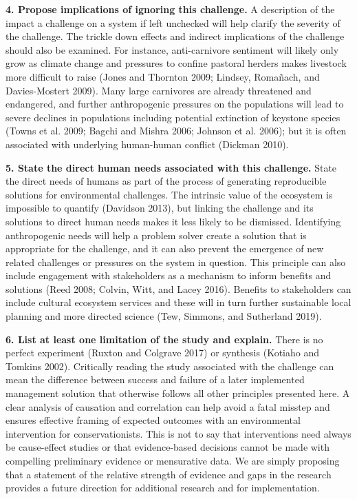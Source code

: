 \documentclass[fleqn,10pt]{wlpeerj} %
\begin{document}
\textbf{4. Propose implications of ignoring this challenge.} A
description of the impact a challenge on a system if left unchecked will
help clarify the severity of the challenge. The trickle down effects and
indirect implications of the challenge should also be examined. For
instance, anti-carnivore sentiment will likely only grow as climate
change and pressures to confine pastoral herders makes livestock more
difficult to raise (Jones and Thornton 2009; Lindsey, Romañach, and
Davies-Mostert 2009). Many large carnivores are already threatened and
endangered, and further anthropogenic pressures on the populations will
lead to severe declines in populations including potential extinction of
keystone species (Towns et al. 2009; Bagchi and Mishra 2006; Johnson et
al. 2006); but it is often associated with underlying human-human
conflict (Dickman 2010).

\textbf{5. State the direct human needs associated with this challenge.}
State the direct needs of humans as part of the process of generating
reproducible solutions for environmental challenges. The intrinsic value
of the ecosystem is impossible to quantify (Davidson 2013), but linking
the challenge and its solutions to direct human needs makes it less
likely to be dismissed. Identifying anthropogenic needs will help a
problem solver create a solution that is appropriate for the challenge,
and it can also prevent the emergence of new related challenges or
pressures on the system in question. This principle can also include
engagement with stakeholders as a mechanism to inform benefits and
solutions (Reed 2008; Colvin, Witt, and Lacey 2016). Benefits to
stakeholders can include cultural ecosystem services and these will in
turn further sustainable local planning and more directed science (Tew,
Simmons, and Sutherland 2019).

\textbf{6. List at least one limitation of the study and explain.} There
is no perfect experiment (Ruxton and Colgrave 2017) or synthesis
(Kotiaho and Tomkins 2002). Critically reading the study associated with
the challenge can mean the difference between success and failure of a
later implemented management solution that otherwise follows all other
principles presented here. A clear analysis of causation and correlation
can help avoid a fatal misstep and ensures effective framing of expected
outcomes with an environmental intervention for conservationists. This
is not to say that interventions need always be cause-effect studies or
that evidence-based decisions cannot be made with compelling preliminary
evidence or mensurative data. We are simply proposing that a statement
of the relative strength of evidence and gaps in the research provides a
future direction for additional research and for implementation.
\end{document}
